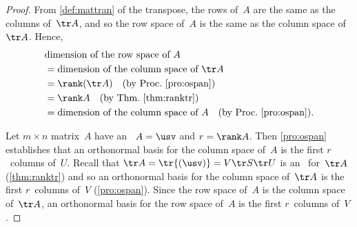 \begin{proof} 
From \autoref{def:mattran} of the transpose, the rows of~\(A\) are the same as the columns of~\(\tr A\), and so the row space of~\(A\) is the same as the column space of~\(\tr A\).  
Hence,
\begin{align*}
&\text{dimension of the row space of }A
\\&=\text{dimension of the column space of }\tr A
\\&=\rank(\tr A) \quad(\text{by Proc.~\ref{pro:ospan}})
\\&=\rank A \quad(\text{by Thm.~\ref{thm:ranktr}})
\\&=\text{dimension of the column space of }A
\quad(\text{by Proc.~\ref{pro:ospan}}).
\end{align*}

Let \(m\times n\) matrix~\(A\) have an \svd\ \(A=\usv\) and \(r=\rank A\).
Then \autoref{pro:ospan} establishes that an orthonormal basis for the column space of~\(A\) is the first \(r\)~columns of~\(U\).
Recall that \(\tr A=\tr{(\usv)} =V\tr S\tr U\) is an \svd\ for~\(\tr A\) (\autoref{thm:ranktr}) and so an orthonormal basis for the column space of~\(\tr A\) is the first \(r\)~columns of~\(V\) (\autoref{pro:ospan}).
Since the row space of~\(A\) is the column space of~\(\tr A\), an orthonormal basis for the row space of~\(A\) is the first \(r\)~columns of~\(V\).
\end{proof}



